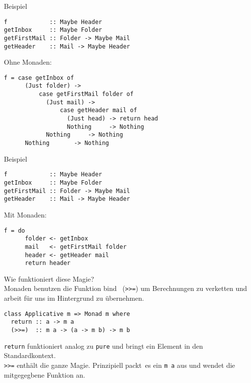 \documentclass{beamer}
\begin{document}
\begin{frame}[fragile]
Beispiel
\begin{verbatim}
f            :: Maybe Header
getInbox     :: Maybe Folder
getFirstMail :: Folder -> Maybe Mail
getHeader    :: Mail -> Maybe Header
\end{verbatim}
\pause
Ohne Monaden:
\begin{verbatim}
f = case getInbox of
      (Just folder) -> 
          case getFirstMail folder of
            (Just mail) -> 
                case getHeader mail of
                  (Just head) -> return head
                  Nothing     -> Nothing
            Nothing     -> Nothing
      Nothing       -> Nothing
\end{verbatim}
\end{frame}
\begin{frame}[fragile]
Beispiel
\begin{verbatim}
f            :: Maybe Header
getInbox     :: Maybe Folder
getFirstMail :: Folder -> Maybe Mail
getHeader    :: Mail -> Maybe Header
\end{verbatim}
Mit Monaden:
\begin{verbatim}
f = do
      folder <- getInbox
      mail   <- getFirstMail folder
      header <- getHeader mail
      return header
\end{verbatim}

\end{frame}

\begin{frame}[fragile]
Wie funktioniert diese Magie?\\
\pause
Monaden benutzen die Funktion \glqq bind \grqq \ (\texttt{>>=}) um Berechnungen zu verketten und arbeit für uns im Hintergrund zu übernehmen.\\
\pause
\begin{verbatim}
class Applicative m => Monad m where
  return :: a -> m a
  (>>=)  :: m a -> (a -> m b) -> m b
\end{verbatim}
\pause
\texttt{return} funktioniert analog zu \texttt{pure} und bringt ein Element in den Standardkontext.\\
\texttt{>>=} enthält die ganze Magie. Prinzipiell \glqq packt\grqq \ es ein \texttt{m a} aus und wendet die mitgegegbene Funktion an.
\end{frame}
\end{document}
